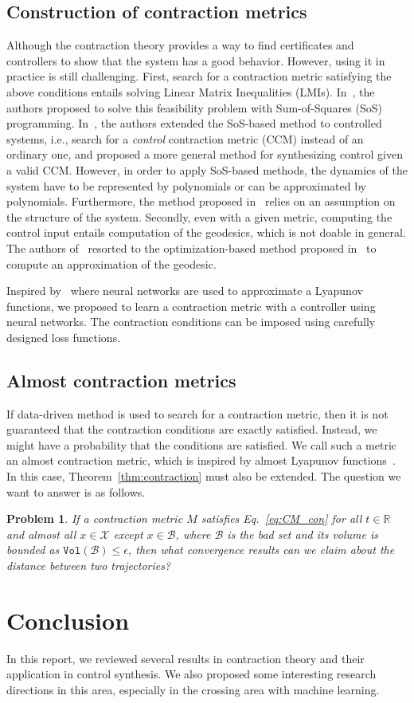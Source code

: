 \documentclass[12pt]{article}
\newtheorem{problem}[theorem]{Problem}
\newcommand{\reals}{\mathbb{R}}
\newcommand{\X}{\mathcal{X}}
\begin{document}
\subsection{Construction of contraction metrics}
Although the contraction theory provides a way to find certificates and controllers to show that the system has a good behavior. However, using it in practice is still challenging. First, search for a contraction metric satisfying the above conditions entails solving Linear Matrix Inequalities (LMIs). In~\cite{aylward2008stability}, the authors proposed to solve this feasibility problem with Sum-of-Squares (SoS) programming. In~\cite{singh2019robust}, the authors extended the SoS-based method to controlled systems, i.e., search for a \textit{control} contraction metric (CCM) instead of an ordinary one, and proposed a more general method for synthesizing control given a valid CCM. However, in order to apply SoS-based methods, the dynamics of the system have to be represented by polynomials or can be approximated by polynomials. Furthermore, the method proposed in~\cite{singh2019robust} relies on an assumption on the structure of the system. Secondly, even with a given metric, computing the control input entails computation of the geodesics, which is not doable in general. The authors of~\cite{singh2019robust} resorted to the optimization-based method proposed in~\cite{leung2017nonlinear} to compute an approximation of the geodesic.

Inspired by~\cite{chang2019neural} where neural networks are used to approximate a Lyapunov functions, we proposed to learn a contraction metric with a controller using neural networks. The contraction conditions can be imposed using carefully designed loss functions.

\subsection{Almost contraction metrics}
If data-driven method is used to search for a contraction metric, then it is not guaranteed that the contraction conditions are exactly satisfied. Instead, we might have a probability that the conditions are satisfied. We call such a metric an almost contraction metric, which is inspired by almost Lyapunov functions~\cite{liu2020almost}. In this case, Theorem~\ref{thm:contraction} must also be extended. The question we want to answer is as follows.
\begin{problem}
If a contraction metric $M$ satisfies Eq.~\eqref{eq:CM_con} for all $t \in \reals$ and almost all $x \in \X$ except $x \in \mathcal{B}$, where $\mathcal{B}$ is the bad set and its volume is bounded as $\texttt{Vol}(\mathcal{B}) \leq \epsilon$, then what convergence results can we claim about the distance between two trajectories?
\end{problem}

\section{Conclusion}
In this report, we reviewed several results in contraction theory and their application in control synthesis. We also proposed some interesting research directions in this area, especially in the crossing area with machine learning.


\end{document}
